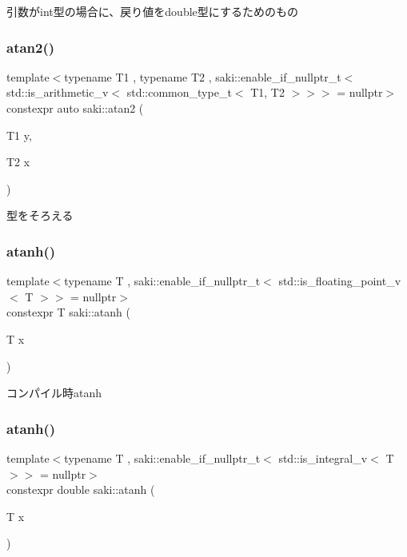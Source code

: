 引数がint型の場合に、戻り値をdouble型にするためのもの 

\mbox{\label{namespacesaki_a3f53502e50280167d22bef45227219f0}} 
\subsubsection{\texorpdfstring{atan2()}{atan2()}\hspace{0.1cm}{\footnotesize\ttfamily [3/3]}}
{\footnotesize\ttfamily template$<$typename T1 , typename T2 , saki\+::enable\+\_\+if\+\_\+nullptr\+\_\+t$<$ std\+::is\+\_\+arithmetic\+\_\+v$<$ std\+::common\+\_\+type\+\_\+t$<$ T1, T2 $>$$>$$>$  = nullptr$>$ \\
constexpr auto saki\+::atan2 (\begin{DoxyParamCaption}\item[{T1}]{y,  }\item[{T2}]{x }\end{DoxyParamCaption})}



型をそろえる 

\mbox{\label{namespacesaki_adbfceeab527c51676d00fae31e077dcf}} 
\subsubsection{\texorpdfstring{atanh()}{atanh()}\hspace{0.1cm}{\footnotesize\ttfamily [1/2]}}
{\footnotesize\ttfamily template$<$typename T , saki\+::enable\+\_\+if\+\_\+nullptr\+\_\+t$<$ std\+::is\+\_\+floating\+\_\+point\+\_\+v$<$ T $>$$>$  = nullptr$>$ \\
constexpr T saki\+::atanh (\begin{DoxyParamCaption}\item[{T}]{x }\end{DoxyParamCaption})}



コンパイル時atanh 

\mbox{\label{namespacesaki_a1b7d87f99b61600e1201b10de467200f}} 
\subsubsection{\texorpdfstring{atanh()}{atanh()}\hspace{0.1cm}{\footnotesize\ttfamily [2/2]}}
{\footnotesize\ttfamily template$<$typename T , saki\+::enable\+\_\+if\+\_\+nullptr\+\_\+t$<$ std\+::is\+\_\+integral\+\_\+v$<$ T $>$$>$  = nullptr$>$ \\
constexpr double saki\+::atanh (\begin{DoxyParamCaption}\item[{T}]{x }\end{DoxyParamCaption})}



